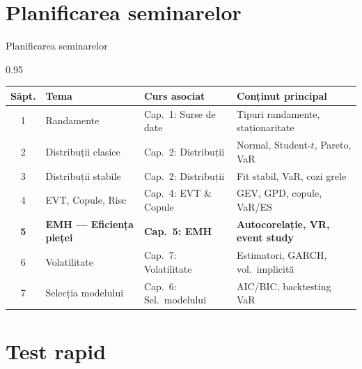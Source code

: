 \documentclass[9pt, aspectratio=169, t]{beamer}
\begin{document}
\section{Planificarea seminarelor}

\begin{frame}{Planificarea seminarelor}
    \begin{cminipage}{0.95\textwidth}
\renewcommand{\arraystretch}{1.3}
\begin{center}
\footnotesize
\begin{tabular}{clll}
\toprule
\textbf{Săpt.} & \textbf{Tema} & \textbf{Curs asociat} & \textbf{Conținut principal} \\
\midrule
1 & Randamente & Cap.\ 1: Surse de date & Tipuri randamente, staționaritate \\
2 & Distribuții clasice & Cap.\ 2: Distribuții & Normal, Student-$t$, Pareto, VaR \\
3 & Distribuții stabile & Cap.\ 2: Distribuții & Fit stabil, VaR, cozi grele \\
4 & EVT, Copule, Risc & Cap.\ 4: EVT \& Copule & GEV, GPD, copule, VaR/ES \\
\rowcolor{MainBlue!10}
\textbf{5} & \textbf{EMH --- Eficiența pieței} & \textbf{Cap.\ 5: EMH} & \textbf{Autocorelație, VR, event study} \\
6 & Volatilitate & Cap.\ 7: Volatilitate & Estimatori, GARCH, vol.\ implicită \\
7 & Selecția modelului & Cap.\ 6: Sel.\ modelului & AIC/BIC, backtesting VaR \\
\bottomrule
\end{tabular}
\end{center}
    \end{cminipage}
\end{frame}

\section{Test rapid}
\end{document}
